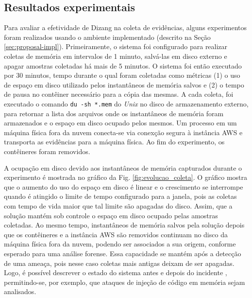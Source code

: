 \documentclass[conference]{IEEEtran}
\newcommand{\marcosT}[1]{{\color{red}{TODO: #1}}}
\newcommand{\fancyname}{Dizang }
\begin{document}
%

\subsection{Resultados experimentais}
\label{sec:proposal-exp}

Para avaliar a efetividade de \fancyname na coleta de evidências, alguns experimentos foram realizados usando o ambiente implementado (descrito na Seção \ref{sec:proposal-impl}).
%
Primeiramente, o sistema foi configurado para realizar coletas de memória em intervalos de 1 minuto, salvá-las em disco externo e apagar amostras coletadas há mais de 5 minutos. 
%
O sistema foi então executado por 30 minutos, tempo durante o qual foram coletadas como métricas (1) o uso de espaço em disco utilizado pelos instantâneos de memória salvos e (2) o tempo de pausa no contêiner necessário para a cópia das mesmas.
%
A cada coleta, foi executado o comando \texttt{du -sh *.mem} do \textit{Unix} no disco de armazenamento externo, para retornar a lista dos arquivos onde os instantâneos de memória foram armazenados e o espaço em disco ocupado pelos mesmos.
%
Um processo em um máquina física fora da nuvem conecta-se via conexção segura à instância AWS e transporta as evidências para a máquina física. 
%
Ao fim do experimento, os contêineres foram removidos.


A ocupação em disco devido aos instantâneos de memória capturados durante o experimento é mostrada no gráfico da Fig. \ref{fig:evolucao_coleta}. 
%
O gráfico mostra que o aumento do uso do espaço em disco é linear e o crescimento se interrompe quando é atingido o limite de tempo configurado para a janela, pois as coletas com tempo de vida maior que tal limite são apagadas do disco. 
%
Assim, que a solução mantém sob controle o espaço em disco ocupado pelas amostras coletadas.
%
Ao mesmo tempo, instantâneos de memória salvos pela solução depois que os contêineres e a instância AWS são removidos continuam no disco da máquina física fora da nuvem, podendo ser associados a sua origem, conforme esperado para uma análise forense.
%
Essa capacidade se mantém após a detecção de uma ameaça, pois nesse caso coletas mais antigas deixam de ser apagadas.
%
Logo, é possível descrever o estado do sistema antes e depois do incidente \cite{Case_Memory_Forensics:2014}, permitindo-se, por exemplo, que ataques de injeção de código em memória sejam analisados.
\end{document}
